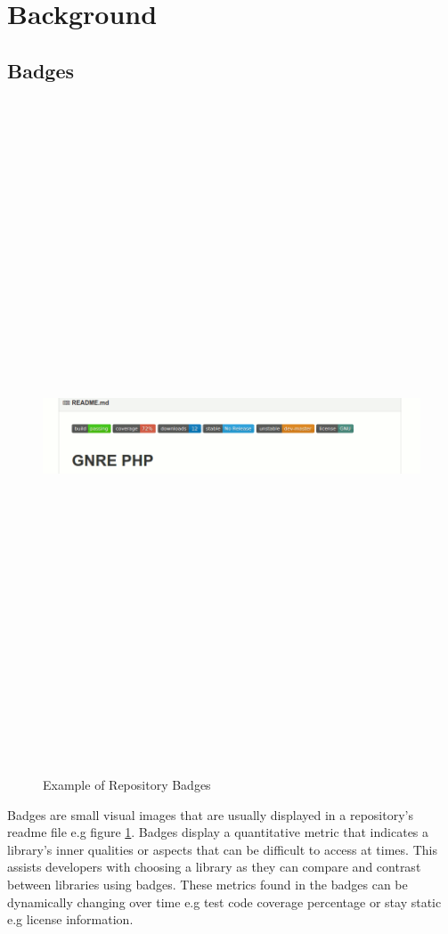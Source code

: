 \documentclass[12pt, letterpaper]{article}
\begin{document}
\section{Background}

\subsection{Badges}
\begin{figure}[!htb]
    \centerline{
        \includegraphics[width=22cm,height=20cm,keepaspectratio=true]{gnrephpbadges}
    }
    \caption{
        Example of Repository Badges \cite{badgeimage}
    }
    \label{gnrephp}
\end{figure}
Badges are small visual images that are usually displayed in a repository's readme file e.g figure \ref{gnrephp}.
Badges display a quantitative metric that indicates a library's inner qualities or aspects that 
can be difficult to access at times. This assists developers with choosing a library
as they can compare and contrast between libraries using badges. These metrics found in the badges
can be dynamically changing over time e.g test code coverage percentage or stay static e.g license information.
\end{document}
